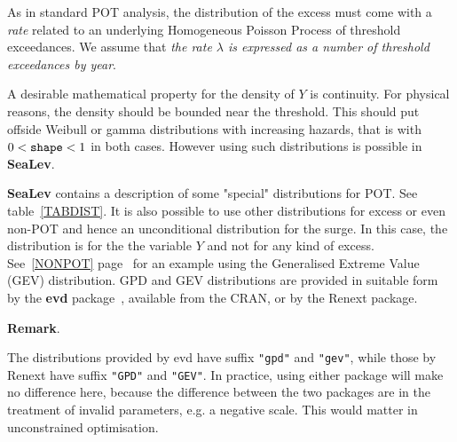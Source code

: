 \documentclass[11pt,a4paper]{report}\usepackage[]{graphicx}\usepackage[]{color}
\newcommand{\pkg}[1]{{\fontseries{b}\selectfont #1}}
\newenvironment{remark}
   {\medskip \par \noindent%
    \small\textbf{Remark}.%
   }%
   {\par \noindent}
\begin{document}
As in standard POT analysis, the distribution of the excess must come
with a \textit{rate} related to an underlying Homogeneous Poisson
Process of threshold exceedances. We assume that \textit{the rate
  $\lambda$ is expressed as a number of threshold exceedances by
  year}.

A desirable mathematical property for the density of $Y$ is continuity.
For physical reasons, the density should be bounded near the
threshold. This should put offside Weibull or gamma distributions with
increasing hazards, that is with $0< \verb@shape@ <1$ in both cases. However
using such distributions is possible in \textbf{SeaLev}.

\textbf{SeaLev} contains a description of some "special" distributions
for POT.  See table~\ref{TABDIST}. It is also possible to use other
distributions for excess or even non-POT and hence an unconditional
distribution for the surge. In this case, the distribution is for the
the variable $Y$ and not for any kind of excess. See~\ref{NONPOT}
page~\pageref{NONPOT} for an example using the Generalised Extreme
Value (GEV) distribution. GPD and GEV distributions are provided in
suitable form by the \textbf{evd} package~\cite{EVDRNEWS}, available
from the CRAN, or by the \pkg{Renext} package.

\begin{remark}
  The distributions provided by \pkg{evd} have suffix \texttt{"gpd"}
  and \texttt{"gev"}, while those by \pkg{Renext} have suffix
  \texttt{"GPD"} and \texttt{"GEV"}. In practice, using either package
  will make no difference here, because the difference between the two
  packages are in the treatment of invalid parameters, e.g. a
  negative scale. This would matter in unconstrained optimisation.
\end{remark}


\end{document}
